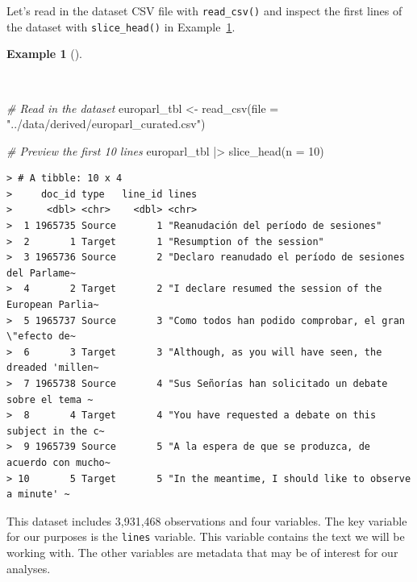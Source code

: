 \documentclass[
  letterpaper,
]{latex/krantz}
\newenvironment{Shaded}{\begin{snugshade}}{\end{snugshade}}
\newcommand{\AttributeTok}[1]{\textcolor[rgb]{0.00,0.00,0.00}{#1}}
\newcommand{\CommentTok}[1]{\textcolor[rgb]{0.00,0.00,0.00}{\textit{#1}}}
\newcommand{\DecValTok}[1]{\textcolor[rgb]{0.00,0.00,0.00}{#1}}
\newcommand{\FunctionTok}[1]{\textcolor[rgb]{0.00,0.00,0.00}{#1}}
\newcommand{\NormalTok}[1]{\textcolor[rgb]{0.00,0.00,0.00}{#1}}
\newcommand{\OtherTok}[1]{\textcolor[rgb]{0.00,0.00,0.00}{#1}}
\newcommand{\SpecialCharTok}[1]{\textcolor[rgb]{0.00,0.00,0.00}{#1}}
\newcommand{\StringTok}[1]{\textcolor[rgb]{0.00,0.00,0.00}{#1}}
\theoremstyle{definition}
\newtheorem{example}{Example}[chapter]
\theoremstyle{remark}
\begin{document}
Let's read in the dataset CSV file with \texttt{read\_csv()} and inspect
the first lines of the dataset with \texttt{slice\_head()} in
Example~\ref{exm-tb-europarl-preview}.

\begin{example}[]\protect\hypertarget{exm-tb-europarl-preview}{}\label{exm-tb-europarl-preview}

~

\begin{Shaded}
\begin{Highlighting}[]
\CommentTok{\# Read in the dataset}
\NormalTok{europarl\_tbl }\OtherTok{\textless{}{-}}
  \FunctionTok{read\_csv}\NormalTok{(}\AttributeTok{file =} \StringTok{"../data/derived/europarl\_curated.csv"}\NormalTok{)}

\CommentTok{\# Preview the first 10 lines}
\NormalTok{europarl\_tbl }\SpecialCharTok{|\textgreater{}}
  \FunctionTok{slice\_head}\NormalTok{(}\AttributeTok{n =} \DecValTok{10}\NormalTok{)}
\end{Highlighting}
\end{Shaded}

\begin{verbatim}
> # A tibble: 10 x 4
>     doc_id type   line_id lines                                                 
>      <dbl> <chr>    <dbl> <chr>                                                 
>  1 1965735 Source       1 "Reanudación del período de sesiones"                 
>  2       1 Target       1 "Resumption of the session"                           
>  3 1965736 Source       2 "Declaro reanudado el período de sesiones del Parlame~
>  4       2 Target       2 "I declare resumed the session of the European Parlia~
>  5 1965737 Source       3 "Como todos han podido comprobar, el gran \"efecto de~
>  6       3 Target       3 "Although, as you will have seen, the dreaded 'millen~
>  7 1965738 Source       4 "Sus Señorías han solicitado un debate sobre el tema ~
>  8       4 Target       4 "You have requested a debate on this subject in the c~
>  9 1965739 Source       5 "A la espera de que se produzca, de acuerdo con mucho~
> 10       5 Target       5 "In the meantime, I should like to observe a minute' ~
\end{verbatim}

\end{example}

This dataset includes 3,931,468 observations and four variables. The key
variable for our purposes is the \texttt{lines} variable. This variable
contains the text we will be working with. The other variables are
metadata that may be of interest for our analyses.
\end{document}
